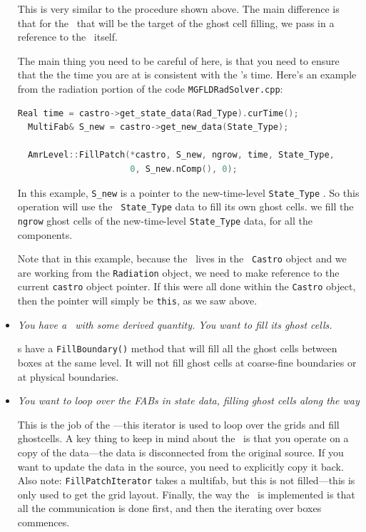 \begin{itemize}
  This is very similar to the procedure shown above.  The main
  difference is that for the \multifab\ that will be the target
  of the ghost cell filling, we pass in a reference to the \statedata\
  itself.  

  The main thing you need to be careful of here, is that you 
  need to ensure that the the time you are at is consistent with
  the \statedata's time.  Here's an example from the radiation
  portion of the code {\tt MGFLDRadSolver.cpp}:

\begin{lstlisting}[language=C++]
  Real time = castro->get_state_data(Rad_Type).curTime();
  MultiFab& S_new = castro->get_new_data(State_Type);

  AmrLevel::FillPatch(*castro, S_new, ngrow, time, State_Type,
                      0, S_new.nComp(), 0); 
\end{lstlisting}

  In this example, {\tt S\_new} is a pointer to the new-time-level
  {\tt State\_Type} \multifab.  So this operation will use the {\tt
    State\_Type} data to fill its own ghost cells.  we fill the {\tt
    ngrow} ghost cells of the new-time-level {\tt State\_Type} data,
  for all the components.

  Note that in this example, because the \statedata\ lives in the {\tt
    Castro} object and we are working from the {\tt Radiation} object,
  we need to make reference to the current {\tt castro} object
  pointer.  If this were all done within the {\tt Castro} object, then
  the pointer will simply be {\tt *this}, as we saw above.

\item {\em You have a \multifab\ with some derived quantity.  You want to
  fill its ghost cells.}

  \multifab s have a {\tt FillBoundary()} method that will fill all
  the ghost cells between boxes at the same level.  It will not fill
  ghost cells at coarse-fine boundaries or at physical boundaries.  

\item {\em You want to loop over the FABs in state data, filling ghost cells
  along the way}

  This is the job of the \code{\fillpatchiterator}---this iterator is used to
  loop over the grids and fill ghostcells.  A key thing to keep in
  mind about the \fillpatchiterator\ is that you operate on a copy
  of the data---the data is disconnected from the original source.  If
  you want to update the data in the source, you need to explicitly
  copy it back.  Also note: {\tt FillPatchIterator} takes a multifab,
  but this is not filled---this is only used to get the grid
  layout.  Finally, the way the \fillpatchiterator\ is implemented
  is that all the communication is done first, and then the iterating
  over boxes commences.


\end{itemize}
